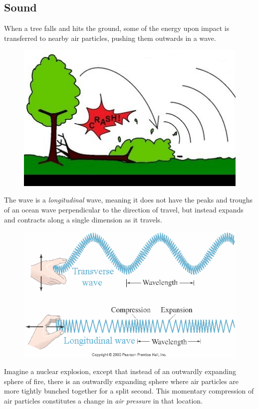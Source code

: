 \documentclass[UTF8]{book}
\begin{document}
\begin{CJK}{UTF8}{gbsn}
\section{Sound}

When a tree falls and hits the ground, some of the energy upon impact is transferred to nearby air particles, pushing them outwards in a wave.

\begin{figure}[H]
\centering
\includegraphics[width=0.8\linewidth]{treefalling_edited}
\end{figure}

The wave is a \emph{longitudinal} wave, meaning it does not have the peaks and troughs of an ocean wave perpendicular to the direction of travel, but instead expands and contracts along a single dimension as it travels.

\begin{figure}[H]
\centering
\includegraphics[width=0.8\linewidth]{longvstransvwave}
\end{figure}

Imagine a nuclear explosion, except that instead of an outwardly expanding sphere of fire, there is an outwardly expanding sphere where air particles are more tightly bunched together for a split second. This momentary compression of air particles constitutes a change in \emph{air pressure} in that location.


\end{CJK}
\end{document}
